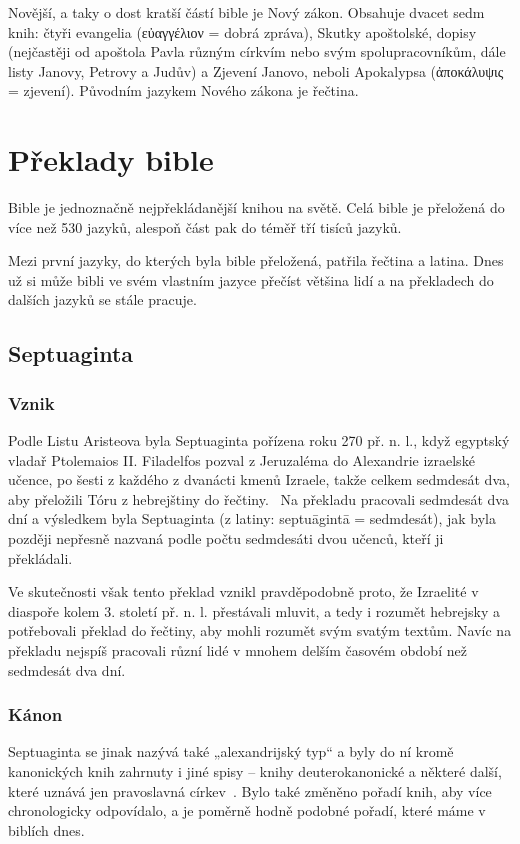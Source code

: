 \documentclass[letterpaper,12pt,oneside]{article}
\begin{document}
Novější, a taky o dost kratší částí bible je Nový zákon. Obsahuje dvacet sedm knih: čtyři evangelia (\textgreek{εὐαγγέλιον} = dobrá zpráva), Skutky apoštolské, dopisy (nejčastěji od apoštola Pavla různým církvím nebo svým spolupracovníkům, dále listy Janovy, Petrovy a Judův) a Zjevení Janovo, neboli Apokalypsa (\textgreek{ἀποκάλυψις} = zjevení). Původním jazykem Nového zákona je řečtina.

\section{Překlady bible}

Bible je jednoznačně nejpřekládanější knihou na světě. Celá bible je přeložená do více než 530 jazyků, alespoň část pak do téměř tří tisíců jazyků.~\cite{wycliffe}

Mezi první jazyky, do kterých byla bible přeložená, patřila řečtina a latina. Dnes už si může bibli ve svém vlastním jazyce přečíst většina lidí a na překladech do dalších jazyků se stále pracuje.

\subsection{Septuaginta}

\subsubsection{Vznik}
Podle Listu Aristeova byla Septuaginta  pořízena roku 270 př. n. l., když egyptský vladař Ptolemaios II. Filadelfos pozval z Jeruzaléma do Alexandrie izraelské učence, po šesti z každého z dvanácti kmenů Izraele, takže celkem sedmdesát dva, aby přeložili Tóru z hebrejštiny do řečtiny.~\cite{LXX}  Na překladu pracovali sedmdesát dva dní a výsledkem byla Septuaginta   (z latiny: septuāgintā = sedmdesát), jak byla později nepřesně nazvaná podle počtu sedmdesáti dvou učenců, kteří ji překládali.

Ve skutečnosti však tento překlad vznikl pravděpodobně proto, že Izraelité  v diaspoře kolem 3. století př. n. l. přestávali mluvit, a tedy i rozumět hebrejsky a potřebovali překlad do řečtiny, aby mohli rozumět svým svatým textům. Navíc na překladu nejspíš pracovali různí lidé v mnohem delším časovém období než sedmdesát dva dní.

\subsubsection{Kánon}
Septuaginta   se jinak nazývá také „alexandrijský typ“ a byly do ní kromě kanonických knih zahrnuty i jiné spisy – knihy deuterokanonické a některé další, které uznává jen pravoslavná církev~\cite{kanon}. Bylo také změněno pořadí knih, aby více chronologicky odpovídalo, a je poměrně hodně podobné pořadí, které máme v biblích dnes.
\end{document}
